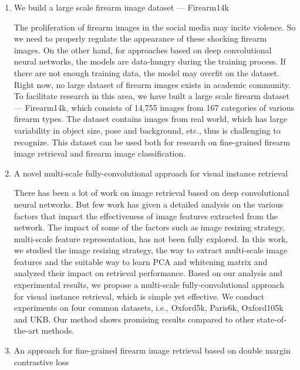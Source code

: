 \begin{enumerate}

\item We build a large scale firearm image dataset --- Firearm14k

The proliferation of firearm images in the social media may incite violence. So we need to properly regulate the appearance of these shocking firearm images. On the other hand, for approaches based on deep convolutional neural networks, the models are data-hungry during the training process. If there are not enough training data, the model may overfit on the dataset. Right now, no large dataset of firearm images exists in academic community. To facilitate research in this area, we have built a large scale firearm dataset --- Firearm14k, which consists of 14,755 images from 167 categories of various firearm types. The dataset contains images from real world, which has large variability in object size, pose and background, etc., thus is challenging to recognize. This dataset can be used both for research on fine-grained firearm image retrieval and firearm image classification.

\item A novel multi-scale fully-convolutional approach for visual instance retrieval

There has been a lot of work on image retrieval based on deep convolutional neural networks. But few work has given a detailed analysis on the various factors that impact the effectiveness of image features extracted from the network. The impact of some of the factors such as image resizing strategy, multi-scale feature representation, has not been fully explored. In this work, we studied the image resizing strategy, the way to extract multi-scale image features and the suitable way to learn PCA and whitening matrix and analyzed their impact on retrieval performance. Based on our analysis and experimental results, we propose a multi-scale fully-convolutional approach for visual instance retrieval, which is simple yet effective. We conduct experiments on four common datasets, i.e., Oxford5k, Paris6k, Oxford105k and UKB. Our method shows promising results compared to other state-of-the-art methods.

\item An approach for fine-grained firearm image retrieval based on double margin contrastive loss


\end{enumerate}
